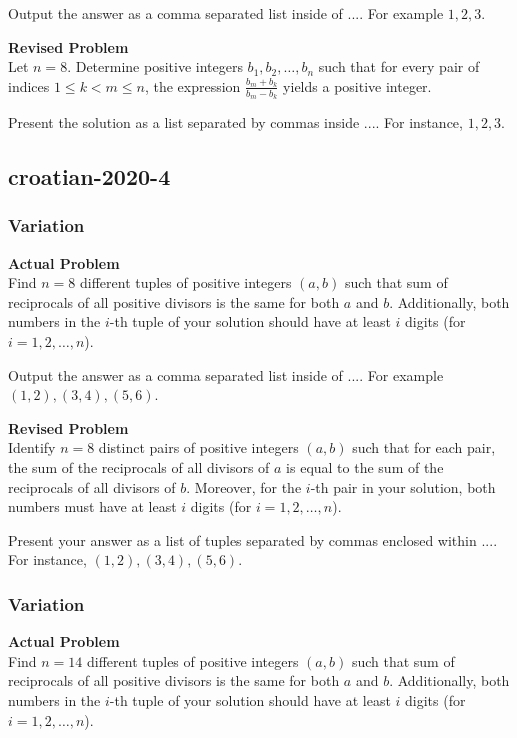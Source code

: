 Output the answer as a comma separated list inside of $\boxed{...}$. For example $\boxed{1, 2, 3}$.

\textbf{Revised Problem}\\
Let $n = 8$. Determine positive integers $b_1, b_2, \ldots, b_n$ such that for every pair of indices $1 \le k < m \le n$, the expression $\frac{b_m+b_k}{b_m-b_k}$ yields a positive integer.

Present the solution as a list separated by commas inside $\boxed{...}$. For instance, $\boxed{1, 2, 3}$.

\subsection{croatian-2020-4}
\subsubsection{Variation}
\textbf{Actual Problem}\\
Find $n = 8$ different tuples of positive integers $(a, b)$ such that sum of reciprocals of all positive divisors is the same for both $a$ and $b$.
Additionally, both numbers in the $i$-th tuple of your solution should have at least $i$ digits (for $i = 1, 2, \ldots, n$).


Output the answer as a comma separated list inside of $\boxed{...}$. For example $\boxed{(1, 2), (3, 4), (5, 6)}$.

\textbf{Revised Problem}\\
Identify $n = 8$ distinct pairs of positive integers $(a, b)$ such that for each pair, the sum of the reciprocals of all divisors of $a$ is equal to the sum of the reciprocals of all divisors of $b$. Moreover, for the $i$-th pair in your solution, both numbers must have at least $i$ digits (for $i = 1, 2, \ldots, n$).

Present your answer as a list of tuples separated by commas enclosed within $\boxed{...}$. For instance, $\boxed{(1, 2), (3, 4), (5, 6)}$.

\subsubsection{Variation}
\textbf{Actual Problem}\\
Find $n = 14$ different tuples of positive integers $(a, b)$ such that sum of reciprocals of all positive divisors is the same for both $a$ and $b$.
Additionally, both numbers in the $i$-th tuple of your solution should have at least $i$ digits (for $i = 1, 2, \ldots, n$).


